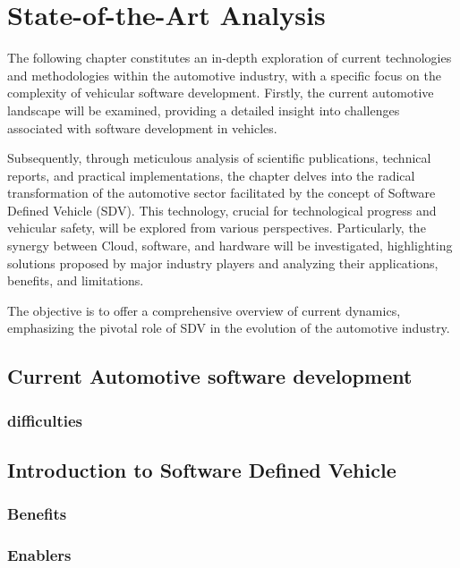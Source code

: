 

\chapter{State-of-the-Art Analysis} \label{ch:State-of-the-Art Analysis}
The following chapter constitutes an in-depth exploration of current technologies and methodologies within the automotive industry, with a specific focus on the complexity of vehicular software development. Firstly, the current automotive landscape will be examined, providing a detailed insight into challenges associated with software development in vehicles.

Subsequently, through meticulous analysis of scientific publications, technical reports, and practical implementations, the chapter delves into the radical transformation of the automotive sector facilitated by the concept of Software Defined Vehicle (SDV). This technology, crucial for technological progress and vehicular safety, will be explored from various perspectives. Particularly, the synergy between Cloud, software, and hardware will be investigated, highlighting solutions proposed by major industry players and analyzing their applications, benefits, and limitations.

The objective is to offer a comprehensive overview of current dynamics, emphasizing the pivotal role of SDV in the evolution of the automotive industry.

\section{Current Automotive software development}
\subsection{difficulties}
\section{Introduction to Software Defined Vehicle}
\subsection{Benefits}
\subsection{Enablers}
